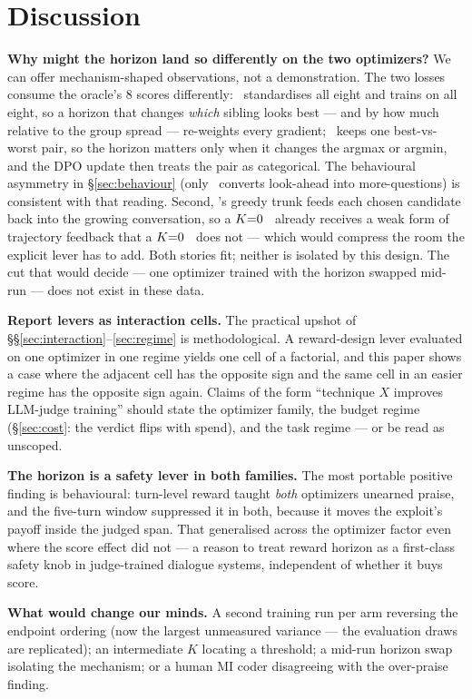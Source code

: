 \section{Discussion}
\label{sec:discussion}

\textbf{Why might the horizon land so differently on the two optimizers?} We can offer
mechanism-shaped observations, not a demonstration. The two losses consume the oracle's $8$
scores differently: \GRPO\ standardises all eight and trains on all eight, so a horizon that
changes \emph{which} sibling looks best --- and by how much relative to the group spread ---
re-weights every gradient; \PTO\ keeps one best-vs-worst pair, so the horizon matters only when
it changes the argmax or argmin, and the DPO update then treats the pair as categorical. The
behavioural asymmetry in \S\ref{sec:behaviour} (only \GRPO\ converts look-ahead into
more-questions) is consistent with that reading. Second, \PTO's greedy trunk feeds each chosen
candidate back into the growing conversation, so a $K{=}0$ \PTO\ already receives a weak form of
trajectory feedback that a $K{=}0$ \GRPO\ does not --- which would compress the room the explicit
lever has to add. Both stories fit; neither is isolated by this design. The cut that would decide
--- one optimizer trained with the horizon swapped mid-run --- does not exist in these data.

\textbf{Report levers as interaction cells.} The practical upshot of
\S\S\ref{sec:interaction}--\ref{sec:regime} is methodological. A reward-design lever evaluated on
one optimizer in one regime yields one cell of a factorial, and this paper shows a case where the
adjacent cell has the opposite sign and the same cell in an easier regime has the opposite sign
again. Claims of the form ``technique $X$ improves LLM-judge training'' should state the
optimizer family, the budget regime (\S\ref{sec:cost}: the verdict flips with spend), and the
task regime --- or be read as unscoped.

\textbf{The horizon is a safety lever in both families.} The most portable positive finding is
behavioural: turn-level reward taught \emph{both} optimizers unearned praise, and the five-turn
window suppressed it in both, because it moves the exploit's payoff inside the judged span. That
generalised across the optimizer factor even where the score effect did not --- a reason to treat
reward horizon as a first-class safety knob in judge-trained dialogue systems, independent of
whether it buys score.

\textbf{What would change our minds.} A second training run per arm reversing the endpoint
ordering (now the largest unmeasured variance --- the evaluation draws are replicated); an
intermediate $K$ locating a threshold; a mid-run horizon swap isolating the mechanism; or a human
MI coder disagreeing with the over-praise finding.
